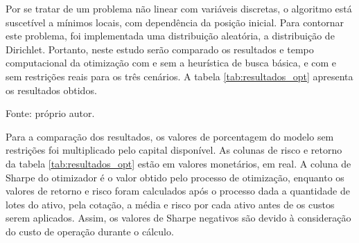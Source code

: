         \ipar Por se tratar de um problema não linear com variáveis discretas, o algoritmo está suscetível a mínimos locais, com dependência da posição inicial. Para contornar este problema, foi implementada uma distribuição aleatória, a distribuição de Dirichlet. Portanto, neste estudo serão comparado os resultados e tempo computacional da otimização com e sem a heurística de busca básica, e com e sem restrições reais para os três cenários. A tabela \ref{tab:resultados_opt} apresenta os resultados obtidos.

        \begin{table}[H]
            \centering
            \caption{Resultados da otimização para os três cenários}
            \label{tab:resultados_opt}
            \par \footnotesize Fonte: próprio autor.
        \end{table}

        \ipar Para a comparação dos resultados, os valores de porcentagem do modelo sem restrições foi multiplicado pelo capital disponível. As colunas de risco e retorno da tabela \ref{tab:resultados_opt} estão em valores monetários, em real. A coluna de Sharpe do otimizador é o valor obtido pelo processo de otimização, enquanto os valores de retorno e risco foram calculados após o processo dada a quantidade de lotes do ativo, pela cotação, a média e risco por cada ativo antes de os custos serem aplicados. Assim, os valores de Sharpe negativos são devido à consideração do custo de operação durante o cálculo. 

